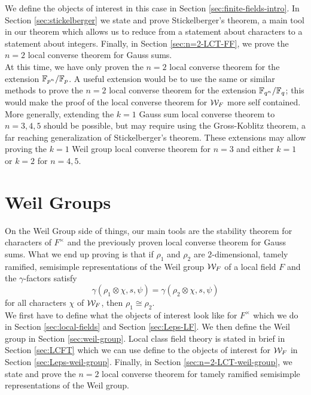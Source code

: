 We define the objects of interest in this case in Section \ref{sec:finite-fields-intro}.
In Section \ref{sec:stickelberger} we state and prove Stickelberger's theorem, a main tool in our theorem which allows us to reduce from a statement about characters to a statement about integers.
Finally, in Section \ref{sec:n=2-LCT-FF}, we prove the $n=2$ local converse theorem for Gauss sums.
\\

At this time, we have only proven the $n=2$ local converse theorem for the extension $\mathbb{F}_{p^n}/\mathbb{F}_{p}$.
A useful extension would be to use the same or similar methods to prove the $n=2$ local converse theorem for the extension $\mathbb{F}_{q^n}/\mathbb{F}_q$; this would make the proof of the local converse theorem for $\mathcal{W}_F$ more self contained.
More generally, extending the $k = 1$ Gauss sum local converse theorem to $n = 3,4,5$ should be possible, but may require using the Gross-Koblitz theorem, a far reaching generalization of Stickelberger's theorem.
These extensions may allow proving the $k = 1$ Weil group local converse theorem for $n = 3$ and either $k = 1$ or $k =2 $ for $n = 4,5$.
\\

\section{Weil Groups}
On the Weil Group side of things, our main tools are the stability theorem for characters of $F^\times$ and the previously proven local converse theorem for Gauss sums.
What we end up proving is that if $\rho_1$ and $\rho_2$ are $2$-dimensional, tamely ramified, semisimple representations of the Weil group $\mathcal{W}_F$ of a local field $F$ and the $\gamma$-factors satisfy
\[\gamma(\rho_1 \otimes \chi, s, \psi) = \gamma(\rho_2 \otimes \chi, s, \psi)\]
for all characters $\chi$ of $\mathcal{W}_F$, then $\rho_1 \cong \rho_2$.
\\

We first have to define what the objects of interest look like for $F^\times$ which we do in Section \ref{sec:local-fields} and Section \ref{sec:Leps-LF}.
We then define the Weil group in Section \ref{sec:weil-group}.
Local class field theory is stated in brief in Section \ref{sec:LCFT} which we can use define to the objects of interest for $\mathcal{W}_F$ in Section \ref{sec:Leps-weil-group}.
Finally, in Section \ref{sec:n=2-LCT-weil-group}, we state and prove the $n=2$ local converse theorem for tamely ramified semisimple representations of the Weil group.
\\


